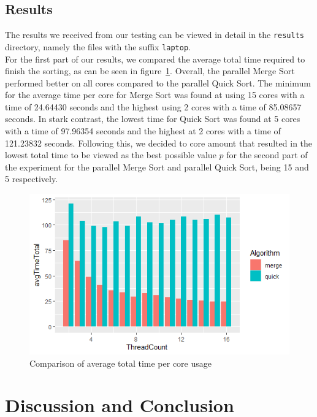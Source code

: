 \documentclass[twocolumn]{article}
\begin{document}
\subsection{Results}%
The results we received from our testing can be viewed in detail in the \texttt{results} directory, namely the files with the suffix \texttt{laptop}.\\
For the first part of our results, we compared the average total time required to finish the sorting, as can be seen in figure~\ref{fig:exp1_totalTime}. Overall, the parallel Merge Sort performed better on all cores compared to the parallel Quick Sort. The minimum for the average time per core for Merge Sort was found at using 15 cores with a time of 24.64430 seconds and the highest using 2 cores with a time of 85.08657 seconds. In stark contrast, the lowest time for Quick Sort was found at 5 cores with a time of 97.96354 seconds and the highest at 2 cores with a time of 121.23832 seconds. Following this, we decided to core amount that resulted in the lowest total time to be viewed as the best possible value $p$ for the second part of the experiment for the parallel Merge Sort and parallel Quick Sort, being 15 and 5 respectively.\\

\begin{figure}[h]
	\includegraphics[scale=0.5]{./figures/exp1_comparison_totaltime.png}
	\centering
	\caption{Comparison of average total time per core usage}
	\label{fig:exp1_totalTime}
\end{figure}



\section{Discussion and Conclusion}
\end{document}
